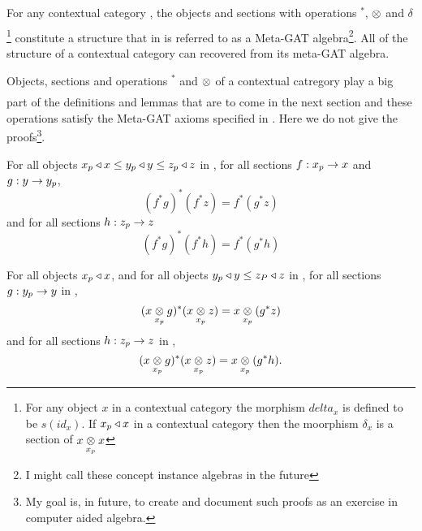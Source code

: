 
For any contextual category \catc, the objects and sections with  operations $^*$,  $\crossx{}{}{}$ 
and $\delta$\footnote{For any object $x$ in a contextual category the morphism $delta_x$ is defined to be  $s(id_x)$. If $x_p \base x$ in 
a contextual category \catcw then the moorphism $\delta_x$ is a section of $\crossx{x}{x}{x_p}$} constitute a structure
that in \cite{CartmellMetaTheory} is referred to as a Meta-GAT algebra\footnote{I might call these concept instance algebras in the future}. 
All of the structure of a contextual category  can recovered from its meta-GAT algebra.

Objects, sections and operations $^*$ and  $\crossx{}{}{}$ of a contextual catregory play a big part of the definitions and lemmas that are to come in the next section
and these operations satisfy the Meta-GAT axioms specified in  \cite{CartmellMetaTheory}.
Here we do not give the proofs\footnote{My goal is, in future, to create and document such proofs as an exercise in computer aided algebra.}.

\begin{lemma}
\note
For all objects $x_p \base x \leq y_p \base y \leq z_p \base z$ in \catc, for all sections $f: x_p \morph x$ and $g: y \morph y_p$, 
\begin{equation}
\label{metagattriplestar}
(f^*g)^*(f^*z)=f^*(g^*z)
\end{equation}
and for all sections $h:z_p \morph z$
\begin{equation}
\label{metagattriplestarsection}
(f^*g)^*(f^*h)=f^*(g^*h)
\end{equation}
\end{lemma}

\begin{lemma}
For all objects $x_p \base x$, and for all objects $y_p \base y \leq z_P \base z$ in \catc, 
for all sections $g:y_p \morph y$ in \catc, 
\begin{equation}
\label{metagatcrossstarcross}
(\crossx{x}{g}{x_p})^*(\crossx{x}{z}{x_p})=\crossx{x}{(g^*z)}{x_p}
\end{equation}
and for all sections $h:z_p \morph z$ in \catc,
\begin{equation}
\label{metagatcrossstarcrosssection}
(\crossx{x}{g}{x_p})^*(\crossx{x}{z}{x_p})=\crossx{x}{(g^*h)}{x_p}.
\end{equation}
\end{lemma}

